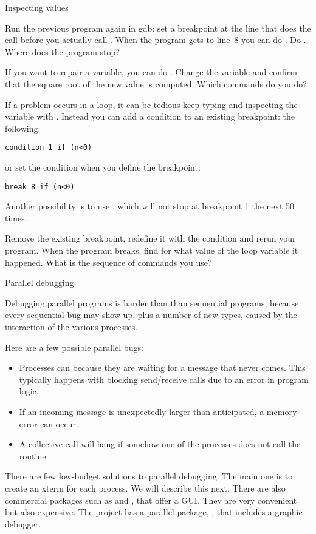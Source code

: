  {Inspecting values}

Run the previous program again in gdb: set a breakpoint at the line
that does the  call before you actually call . When the
program gets to line~8 you can do . Do . Where does
the program stop?

If you want to repair a variable, you can do . Change
the variable  and confirm that the square root of the new value
is computed. Which commands do you do?

If a problem occurs in a loop, it can be tedious keep typing 
and inspecting the variable with . Instead you can add a
condition to an existing breakpoint:
the following:
\begin{verbatim}
condition 1 if (n<0)
\end{verbatim}
or set the condition when you define the breakpoint:
\begin{verbatim}
break 8 if (n<0)
\end{verbatim}
Another possibility is to use , which will not stop at
breakpoint 1 the next 50 times.

Remove the existing breakpoint, redefine it with the condition 
and rerun your program. When the program breaks, find for what value
of the loop variable it happened. What is the sequence of commands you use?


 {Parallel debugging}

Debugging parallel programs is harder than than sequential
programs, because every sequential bug may show up, plus a number
of new types, caused by the interaction of the various processes.

Here are a few possible parallel bugs:
\begin{itemize}
\item Processes can  because they are waiting for
  a message that never comes. This typically happens with blocking
  send/receive calls due to an error in program logic.
\item If an incoming message is unexpectedly larger than anticipated,
  a memory error can occur.
\item A collective call will hang if somehow one of the processes does
  not call the routine.
\end{itemize}

There are few low-budget solutions to parallel debugging. The main one
is to create an xterm for each process. We will describe this next.
There are also commercial packages such as  and
, that offer a GUI. They are very convenient but
also expensive. The  project has a parallel package, 
, that includes a graphic debugger.

